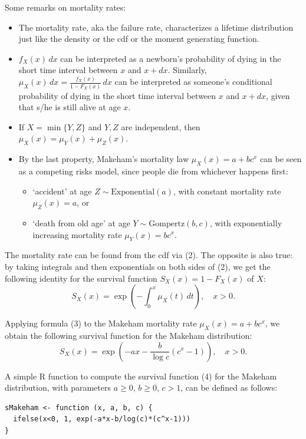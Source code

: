 \documentclass{article}
\begin{document}
\begin{enumerate}
Some remarks on mortality rates:
\begin{itemize}
    \item The mortality rate, aka the failure rate, characterizes a lifetime distribution just like the density or the cdf or the moment generating function.
    \item $f_X(x)\, dx$ can be interpreted as a newborn's probability of dying in the short time interval between $x$ and $x + dx$. Similarly, $\mu_X(x)\, dx = \frac{f_X(x)}{1-F_X(x)}\, dx$ can be interpreted as someone's conditional probability of dying in the short time interval between $x$ and $x + dx$, given that s/he is still alive at age $x$.
    \item If $X = \min\{Y, Z\}$ and $Y, Z$ are independent, then $\mu_X(x) = \mu_Y(x) + \mu_Z(x)$.
    \item By the last property, Makeham's mortality law $\mu_X(x) = a + bc^x$ can be seen as a competing risks model, since people die from whichever happens first:
    \begin{itemize}
        \item `accident' at age $Z \sim \text{Exponential}(a)$, with constant mortality rate $\mu_Z(x) = a$, or
        \item `death from old age' at age $Y \sim \text{Gompertz}(b, c)$, with exponentially increasing mortality rate $\mu_Y(x) = bc^x$.
    \end{itemize}
\end{itemize}

The mortality rate can be found from the cdf via (2). The opposite is also true: by taking integrals and then exponentials on both sides of (2), we get the following identity for the survival function $S_X(x) = 1 - F_X(x)$ of $X$:
\begin{equation}
S_X(x) = \exp\left(-\int_0^x \mu_X(t)\, dt\right), \quad x > 0.
\end{equation}

Applying formula (3) to the Makeham mortality rate $\mu_X(x) = a + bc^x$, we obtain the following survival function for the Makeham distribution:
\begin{equation}
S_X(x) = \exp\left(-ax - \frac{b}{\log c}(c^x - 1)\right), \quad x > 0.
\end{equation}

A simple R function to compute the survival function (4) for the Makeham distribution, with parameters $a \geq 0$, $b \geq 0$, $c > 1$, can be defined as follows:
\begin{verbatim}
sMakeham <- function (x, a, b, c) {
  ifelse(x<0, 1, exp(-a*x-b/log(c)*(c^x-1)))
}
\end{verbatim}


\end{enumerate}
\end{document}
